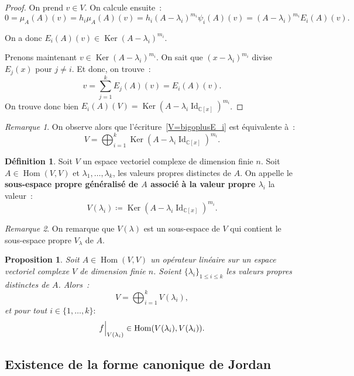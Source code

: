 \documentclass{article}
\DeclareMathOperator{\Id}{Id}
\DeclareMathOperator{\Ker}{Ker}
\DeclareMathOperator{\Hom}{Hom}
\newcommand{\C}{\mathbb C}
\newcommand{\restr}[2]{ %
	\left.\kern-\nulldelimiterspace %
	#1 %
	\vphantom{\big|} %
	\right|_{#2} %
}
\newtheorem{prp}[thm]{Proposition}
\theoremstyle{definition}
\newtheorem{déf}[thm]{Définition}
\theoremstyle{remark}
\newtheorem*{rmq}{Remarque}
\begin{document}
		\begin{proof} On prend $v \in V$. On calcule ensuite~:
		\[0 = \mu_A(A)(v) = h_i\mu_A(A)(v) = h_i(A - \lambda_i)^{m_i}\psi_i(A)(v) = (A-\lambda_i)^{m_i}E_i(A)(v).\]

		On a donc $E_i(A)(v) \in \Ker(A - \lambda_i)^{m_i}$.

		Prenons maintenant $v \in \Ker(A - \lambda_i)^{m_i}$. On sait que $(x-\lambda_i)^{m_i}$ divise $E_j(x)$ pour $j \neq i$.
		Et donc, on trouve~: \[v = \sum_{j=1}^kE_j(A)(v) = E_i(A)(v).\]
		On trouve donc bien $E_i(A)(V) = \Ker(A-\lambda_i\Id_{\C[x]})^{m_i}$. \end{proof}

		\begin{rmq} On observe alors que l'écriture~\eqref{V=bigoplusE_i} est équivalente à~:
		\[V = \bigoplus_{i=1}^k\Ker(A - \lambda_i\Id_{\C[x]})^{m_i}.\]
		\end{rmq}

		\begin{déf} Soit $V$ un espace vectoriel complexe de dimension finie $n$. Soit $A \in \Hom(V, V)$ et $\lambda_1, \dotsc, \lambda_k$, les valeurs propres
		distinctes de $A$. On appelle le \textbf{sous-espace propre généralisé de $A$ associé à la valeur propre $\lambda_i$} la valeur~:
		\[V(\lambda_i) \coloneqq \Ker(A - \lambda_i \Id_{\C[x]})^{m_i}.\] \end{déf}

		\begin{rmq} On remarque que $V(\lambda)$ est un sous-espace de $V$ qui contient le sous-espace propre $V_\lambda$ de $A$. \end{rmq}

		\begin{prp} Soit $A \in \Hom(V, V)$ un opérateur linéaire sur un espace vectoriel complexe $V$ de dimension finie $n$. Soient $\{\lambda_i\}_{1 \leq i \leq k}$
		les valeurs propres distinctes de $A$. Alors~:
		\begin{equation}
			V = \bigoplus_{i=1}^kV(\lambda_i),
		\end{equation}
		et pour tout $i \in \{1, \dotsc, k\} :$
		\[\restr f{V(\lambda_i)} \in \Hom(V(\lambda_i), V(\lambda_i)).\]
		\end{prp}

	\subsection{Existence de la forme canonique de Jordan}
		
\end{document}
